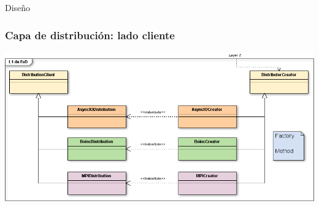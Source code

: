 \begin{subsection}{Diseño}
	\begin{frame}\frametitle{Capa de distribución: lado cliente}
		\begin{center}
			\includegraphics[scale=0.35]{images/diseno-cliente-fud.png}
		\end{center}
	\end{frame}


\end{subsection}
